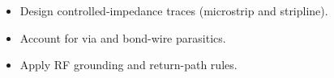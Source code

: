 \begin{objectives}
\begin{itemize}[leftmargin=1.4em,itemsep=2pt]
\item Design controlled-impedance traces (microstrip and stripline).
\item Account for via and bond-wire parasitics.
\item Apply RF grounding and return-path rules.
\end{itemize}
\end{objectives}
